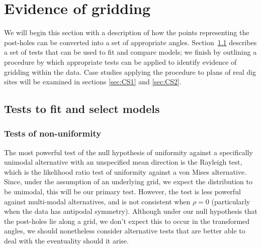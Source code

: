 \documentclass[../../ArchStats.tex]{subfiles}
\begin{document}


\section{Evidence of gridding}

We will begin this section with a description of how the points representing the post-holes can be converted into a set of appropriate angles. Section~\ref{sec:model-fitting-tests} describes a set of tests that can be used to fit and compare models; we finish by outlining a procedure by which appropriate tests can be applied to identify evidence of gridding within the data. Case studies applying the procedure to plans of real dig sites will be examined in sections \ref{sec:CS1} and \ref{sec:CS2}.





\subsection{Tests to fit and select models}
\label{sec:model-fitting-tests}

\subsubsection{Tests of non-uniformity}
\label{sec:unif-tests}

The most powerful test of the null hypothesis of uniformity against a specifically unimodal alternative with an unspecified mean direction is the Rayleigh test, which is the likelihood ratio test of uniformity against a von Mises alternative. Since, under the assumption of an underlying grid, we expect the distribution to be unimodal, this will be our primary test. However, the test is less powerful against multi-modal alternatives, and is not consistent when $\rho = 0$ (particularly when the data has antipodal symmetry). Although under our null hypothesis that the post-holes lie along a grid, we don't expect this to occur in the transformed angles, we should nonetheless consider alternative tests that are better able to deal with the eventuality should it arise.
\end{document}
